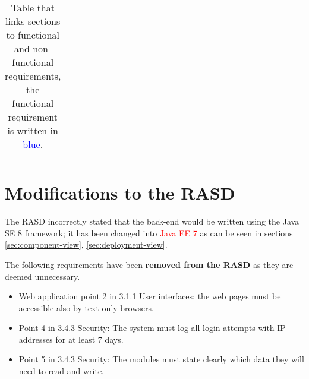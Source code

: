 \begin{table}[h]
\begin{center}
\begin{tabular}{|p{}|p{}|}
\end{tabular}
\caption{Table that links sections to functional and non-functional requirements, the functional requirement is written in  \textcolor{blue}{blue}.}
\label{non-func-req}
\end{center}
\end{table}

\section{Modifications to the RASD}
\label{sec:RASD-changes}

The RASD incorrectly stated that the back-end would be written using the Java SE 8 framework; it has been changed into \textcolor{red}{Java EE 7} as can be seen in sections \ref{sec:component-view}, \ref{sec:deployment-view}.

The following requirements have been {\bf removed from the RASD} as they are deemed unnecessary.
\begin{itemize}
\item Web application point 2 in 3.1.1 User interfaces: the web pages must be accessible also by text-only browsers.
\item Point 4 in 3.4.3 Security: The system must log all login attempts with IP addresses for at least 7 days.
\item Point 5 in 3.4.3 Security: The modules must state clearly which data they will need to read and write.
\end{itemize}
